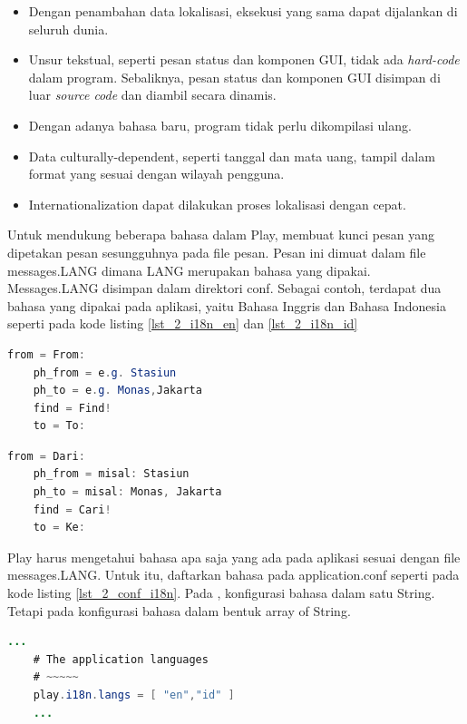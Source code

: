 \begin{itemize}
	\item Dengan penambahan data lokalisasi, eksekusi yang sama dapat dijalankan di seluruh dunia.
	\item Unsur tekstual, seperti pesan status dan komponen GUI, tidak ada \textit{hard-code} dalam program. Sebaliknya, pesan status dan komponen GUI disimpan di luar \textit{source code} dan diambil secara dinamis.
	\item Dengan adanya bahasa baru, program tidak perlu dikompilasi ulang.
	\item Data culturally-dependent, seperti tanggal dan mata uang, tampil dalam format yang sesuai dengan wilayah pengguna.
	\item Internationalization dapat dilakukan proses lokalisasi dengan cepat.
\end{itemize}

Untuk mendukung beberapa bahasa dalam Play, membuat kunci pesan yang dipetakan pesan sesungguhnya pada file pesan. Pesan ini dimuat dalam file messages.LANG dimana LANG merupakan bahasa yang dipakai. Messages.LANG disimpan dalam direktori conf. Sebagai contoh, terdapat dua bahasa yang dipakai pada aplikasi, yaitu Bahasa Inggris dan Bahasa Indonesia seperti pada kode listing \ref{lst_2_i18n_en} dan \ref{lst_2_i18n_id}

\begin{lstlisting}[caption=Contoh messages.en untuk i18n,label = {lst_2_i18n_en},language=Java]
	from = From:
	ph_from = e.g. Stasiun
	ph_to = e.g. Monas,Jakarta
	find = Find!
	to = To:
\end{lstlisting}

\begin{lstlisting}[caption=Contoh messages.id untuk i18n,label = {lst_2_i18n_id},language=Java]
	from = Dari:
	ph_from = misal: Stasiun
	ph_to = misal: Monas, Jakarta
	find = Cari!
	to = Ke:
\end{lstlisting}

Play harus mengetahui bahasa apa saja yang ada pada aplikasi sesuai dengan file messages.LANG. Untuk itu, daftarkan bahasa pada application.conf seperti pada kode listing \ref{lst_2_conf_i18n}. Pada \cite{playforjava}, konfigurasi bahasa dalam satu String. Tetapi pada  konfigurasi bahasa dalam bentuk array of String.

\begin{lstlisting}[caption=Konfigurasi Bahasa i18n,label = {lst_2_conf_i18n},language=Java]
	...
	# The application languages
	# ~~~~~
	play.i18n.langs = [ "en","id" ]
	...
\end{lstlisting}

